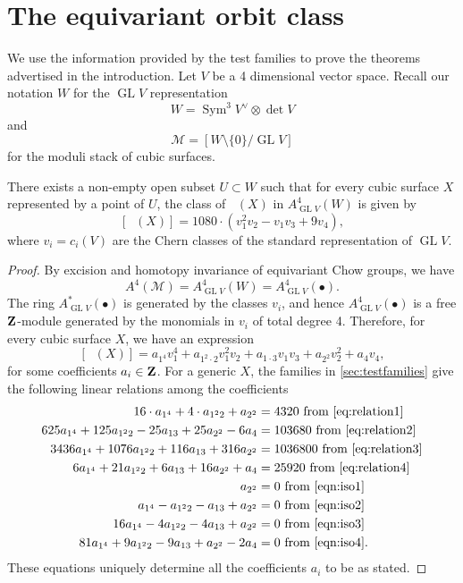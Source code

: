 \documentclass[reqno]{amsart}
\DeclareMathOperator{\Orb}{\overline{Orb}}
\providecommand {\Z}{{\bf Z}}
\providecommand{\GL}{\operatorname{GL}}
\providecommand{\Sym}{\operatorname{Sym}}
\numberwithin{equation}{section}
\begin{document}
\section{The equivariant orbit class}
\label{sec:tietogether}
We use the information provided by the test families to prove the theorems advertised in the introduction.
Let $V$ be a 4 dimensional vector space.
Recall our notation $W$ for the $\GL V$ representation
\[W = \Sym^3V^{\vee} \otimes \det V\]
and
\[\mathscr{M} = \left[ W \setminus \{0\} / \GL V \right]\]
for the moduli stack of cubic surfaces.
\begin{theorem}\label{thm:eqvclass}
  There exists a non-empty open subset $U \subset W$ such that for every cubic surface $X$ represented by a point of $U$, the class of $\Orb(X)$ in $A^4_{\GL V}(W)$ is given by
  \[
    [\Orb(X)] = 1080 \cdot \left(v_{1}^{2}v_{2} - v_{1}v_{3}+ 9v_{4}\right),
  \]
  where $v_i = c_i(V)$ are the Chern classes of the standard representation of $\GL V$.
\end{theorem}
\begin{proof}
  By excision and homotopy invariance of equivariant Chow groups, we have
  \[ A^4(\mathscr{M}) = A^4_{\GL V}(W) = A^4_{\GL V}(\bullet).\]
  The ring $A^*_{\GL V}(\bullet)$ is generated by the classes $v_i$, and hence $A^4_{\GL V}(\bullet)$ is a free $\Z$-module generated by the monomials in $v_i$ of total degree 4.
  Therefore, for every cubic surface $X$, we have an expression
  \[[\Orb(X)] = a_{1^4}v_1^4 + a_{1^2\cdot 2} v_1^2v_2 + a_{1\cdot 3} v_1v_3 + a_{2^2}v_2^2 + a_4 v_4,\]
  for some coefficients $a_i \in \Z$.
  For a generic $X$, the families in \autoref{sec:testfamilies} give the following linear relations among the coefficients
  \begin{align*}
    16 \cdot a_{1^4} + 4 \cdot a_{1^2 2} + a_{2^2} &= 4320 \text{ from \eqref{eq:relation1}}\\
    625 a_{1^{4}} + 125 a_{1^{2}2} - 25a_{13} + 25a_{2^2} - 6 a_{4} &= 103680 \text{ from \eqref{eq:relation2}}\\
    3436a_{1^4} + 1076 a_{1^{2}2} +116 a_{13} + 316 a_{2^2} &= 1036800 \text{ from \eqref{eq:relation3}}\\
    6a_{1^{4}} + 21a_{1^{2}2}+6a_{13}+16a_{2^{2}}+a_{4} &= 25920 \text{ from \eqref{eq:relation4}}\\
    a_{2^2} &= 0  \text{ from \eqref{eqn:iso1}}\\
    a_{1^4} - a_{1^2 2}- a_{13} +  a_{2^2}  &= 0  \text{ from \eqref{eqn:iso2}}\\
    16a_{1^4} -4a_{1^2 2}- 4a_{13} +  a_{2^2}  &= 0  \text{ from \eqref{eqn:iso3}}\\
    81a_{1^4} +9a_{1^2 2}- 9a_{13} +  a_{2^2}-2a_4  &= 0  \text{ from \eqref{eqn:iso4}}.
  \end{align*}
  These equations uniquely determine all the coefficients $a_i$ to be as stated.
\end{proof}
\end{document}
